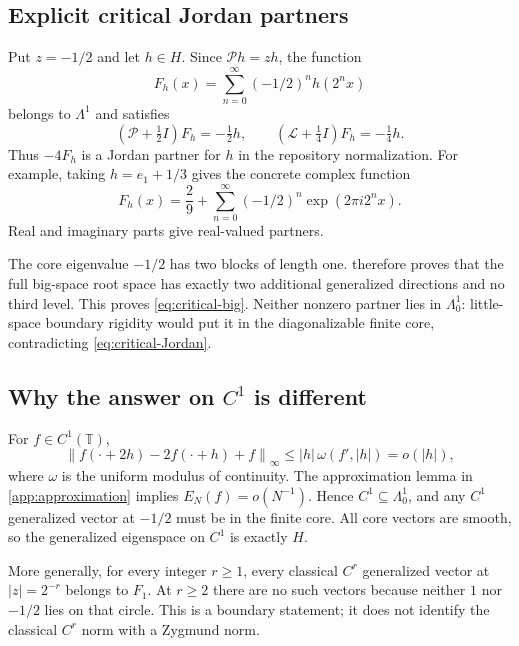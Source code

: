 \documentclass[11pt,a4paper]{article}
\numberwithin{equation}{section}
\theoremstyle{definition}
\theoremstyle{remark}
\newcommand{\T}{\mathbb T}
\newcommand{\Pp}{\mathcal P}
\newcommand{\Ll}{\mathcal L}
\newcommand{\norm}[1]{\left\lVert#1\right\rVert}
\newcommand{\smallspace}{\Lambda_0}
\begin{document}
\subsection{Explicit critical Jordan partners}
Put $z=-1/2$ and let $h\in H$. Since $\Pp h=zh$, the function
\begin{equation}
 F_h(x)=\sum_{n=0}^\infty(-1/2)^n h(2^n x)
 \label{eq:critical-F}
\end{equation}
belongs to $\Lambda^1$ and satisfies
\begin{equation}
 (\Pp+\tfrac12I)F_h=-\tfrac12h,
 \qquad (\Ll+\tfrac14I)F_h=-\tfrac14h.
 \label{eq:critical-Jordan}
\end{equation}
Thus $-4F_h$ is a Jordan partner for $h$ in the repository normalization.
For example, taking $h=e_1+1/3$ gives the concrete complex function
\begin{equation}
 F_h(x)=\frac29+\sum_{n=0}^\infty(-1/2)^n
 \exp(2\pi i2^n x).
 \label{eq:explicit-Weierstrass}
\end{equation}
Real and imaginary parts give real-valued partners.

The core eigenvalue $-1/2$ has two blocks of length one.
 therefore proves that the full big-space
root space has exactly two additional generalized directions and no
third level. This proves \eqref{eq:critical-big}. Neither nonzero
partner lies in $\smallspace^1$: little-space boundary rigidity would
put it in the diagonalizable finite core, contradicting
\eqref{eq:critical-Jordan}.

\subsection{Why the answer on \texorpdfstring{$C^1$}{C1} is different}
For $f\in C^1(\T)$,
\begin{equation}
 \norm{f(\cdot+2h)-2f(\cdot+h)+f}_\infty
 \le |h|\,\omega(f',|h|)=o(|h|),
 \label{eq:C1-little}
\end{equation}
where $\omega$ is the uniform modulus of continuity. The approximation
lemma in \cref{app:approximation} implies $E_N(f)=o(N^{-1})$.
Hence $C^1\subseteq\smallspace^1$, and any $C^1$ generalized vector
at $-1/2$ must be in the finite core. All core vectors are smooth, so
the generalized eigenspace on $C^1$ is exactly $H$.

More generally, for every integer $r\ge1$, every classical $C^r$
generalized vector at $|z|=2^{-r}$ belongs to $F_1$. At $r\ge2$
there are no such vectors because neither $1$ nor $-1/2$ lies on that
circle. This is a boundary statement; it does not identify the
classical $C^r$ norm with a Zygmund norm.
\end{document}
